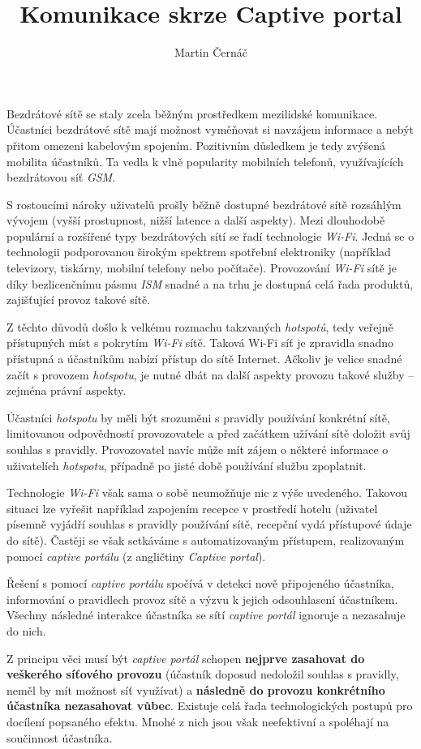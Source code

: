 \documentclass[thesis=M,czech]{FITthesis}[2012/10/20]
\title{Komunikace skrze Captive portal}
\author{Martin Černáč} %
\begin{document}
\begin{introduction}
Bezdrátové sítě se staly zcela běžným prostředkem mezilidské komunikace. Účastníci bezdrátové sítě mají možnost vyměňovat si navzájem informace a nebýt přitom omezeni kabelovým spojením. Pozitivním důsledkem je tedy zvýšená mobilita účastníků. Ta vedla k vlně popularity mobilních telefonů, využívajících bezdrátovou síť \textit{GSM}.

S rostoucími nároky uživatelů prošly běžně dostupné bezdrátové sítě rozsáhlým vývojem (vyšší prostupnost, nižší latence a další aspekty). Mezi dlouhodobě populární a rozšířené typy bezdrátových sítí se řadí technologie \textit{Wi-Fi}. Jedná se o technologii podporovanou širokým spektrem spotřební elektroniky (například televizory, tiskárny, mobilní telefony nebo počítače). Provozování \textit{Wi-Fi} sítě je díky bezlicenčnímu pásmu \textit{ISM} snadné a na trhu je dostupná celá řada produktů, zajišťující provoz takové sítě.

Z těchto důvodů došlo k velkému rozmachu takzvaných \textit{hotspotů}, tedy veřejně přístupných míst s pokrytím \textit{Wi-Fi} sítě. Taková Wi-Fi síť je zpravidla snadno přístupná a účastníkům nabízí přístup do sítě Internet. Ačkoliv je velice snadné začít s provozem \textit{hotspotu}, je nutné dbát na další aspekty provozu takové služby -- zejména právní aspekty.

Účastníci \textit{hotspotu} by měli být srozuměni s pravidly používání konkrétní sítě, limitovanou odpovědností provozovatele a před začátkem užívání sítě doložit svůj souhlas s pravidly. Provozovatel navíc může mít zájem o některé informace o uživatelích \textit{hotspotu}, případně po jisté době používání službu zpoplatnit.

Technologie \textit{Wi-Fi} však sama o sobě neumožňuje nic z výše uvedeného. Takovou situaci lze vyřešit například zapojením recepce v prostředí hotelu (uživatel písemně vyjádří souhlas s pravidly používání sítě, recepční vydá přístupové údaje do sítě). Častěji se však setkáváme s automatizovaným přístupem, realizovaným pomocí \textit{captive portálu} (z angličtiny \textit{Captive portal}).

Řešení s pomocí \textit{captive portálu} spočívá v detekci nově připojeného účastníka, informování o pravidlech provoz sítě a výzvu k jejich odsouhlasení účastníkem. Všechny následné interakce účastníka se sítí \textit{captive portál} ignoruje a nezasahuje do nich.

Z principu věci musí být \textit{captive portál} schopen \textbf{nejprve zasahovat do veškerého síťového provozu} (účastník doposud nedoložil souhlas s pravidly, neměl by mít možnost síť využívat) a \textbf{následně do provozu konkrétního účastníka nezasahovat vůbec}. Existuje celá řada technologických postupů pro docílení popsaného efektu. Mnohé z nich jsou však neefektivní a spoléhají na součinnost účastníka.


\end{introduction}
\end{document}
